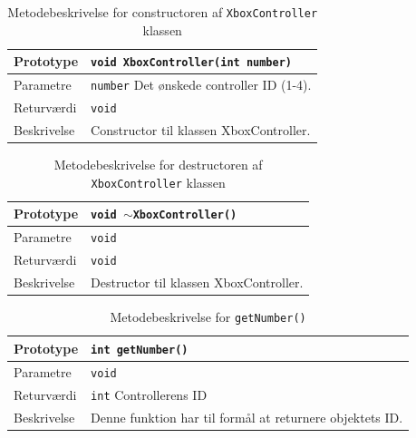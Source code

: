 \begin{table}[h]
\begin{tabularx}{\textwidth}{| L{2.5 cm} | Z |} \hline
Prototype 	& \texttt{void XboxController(int number)} \\\hline
Parametre 	& \texttt{number} 			\newline Det ønskede controller ID (1-4). \\\hline
Returværdi	& \texttt{void} 			\newline \\\hline
Beskrivelse	& Constructor til klassen XboxController. \newline \\\hline
\end{tabularx}
\caption{Metodebeskrivelse for constructoren af \texttt{XboxController} klassen}
\label{table:met_xboxcontroller}
\end{table}

\clearpage

\begin{table}[h]
\begin{tabularx}{\textwidth}{| L{2.5 cm} | Z |} \hline
Prototype 	& \texttt{void $\sim$XboxController()} \\\hline
Parametre 	& \texttt{void}				\newline \\\hline
Returværdi	& \texttt{void} 			\newline \\\hline
Beskrivelse	& Destructor til klassen XboxController. \newline \\\hline
\end{tabularx}
\caption{Metodebeskrivelse for destructoren af \texttt{XboxController} klassen}
\label{table:met_xboxcontroller_de}
\end{table}

\begin{table}[h]
\begin{tabularx}{\textwidth}{| L{2.5 cm} | Z |} \hline
Prototype 	& \texttt{int getNumber()} \\\hline
Parametre 	& \texttt{void}				\newline \\\hline
Returværdi	& \texttt{int} 				\newline Controllerens ID \\\hline
Beskrivelse	& Denne funktion har til formål at returnere objektets ID. \newline \\\hline
\end{tabularx}
\caption{Metodebeskrivelse for \texttt{getNumber()}}
\label{table:met_getnumber}
\end{table}

